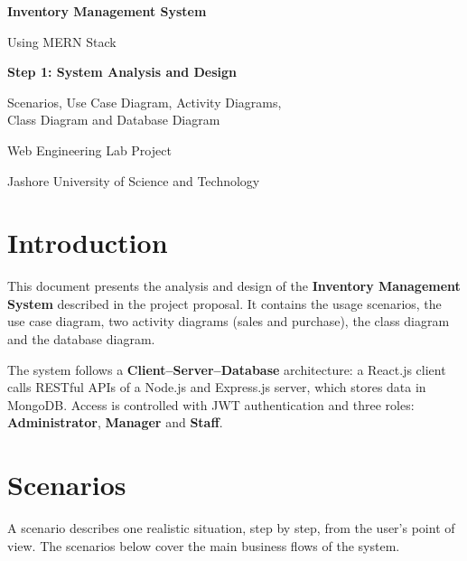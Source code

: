 \documentclass[11pt,a4paper]{article}
\begin{document}
\begin{titlepage}
  \centering
  \vspace*{3cm}
  {\LARGE\bfseries Inventory Management System\par}
  \vspace{0.4cm}
  {\Large Using MERN Stack\par}
  \vspace{1.5cm}
  {\Large\bfseries Step 1: System Analysis and Design\par}
  \vspace{0.4cm}
  {\large Scenarios, Use Case Diagram, Activity Diagrams,\\ Class Diagram and Database Diagram\par}
  \vfill
  {\large Web Engineering Lab Project\par}
  \vspace{0.3cm}
  {\large Jashore University of Science and Technology\par}
  \vspace{2cm}
\end{titlepage}

\tableofcontents
\newpage

\section{Introduction}
This document presents the analysis and design of the \textbf{Inventory Management System}
described in the project proposal. It contains the usage scenarios, the use case diagram,
two activity diagrams (sales and purchase), the class diagram and the database diagram.

The system follows a \textbf{Client--Server--Database} architecture: a React.js client
calls RESTful APIs of a Node.js and Express.js server, which stores data in MongoDB.
Access is controlled with JWT authentication and three roles:
\textbf{Administrator}, \textbf{Manager} and \textbf{Staff}.

\section{Scenarios}
A scenario describes one realistic situation, step by step, from the user's point of view.
The scenarios below cover the main business flows of the system.
\end{document}

